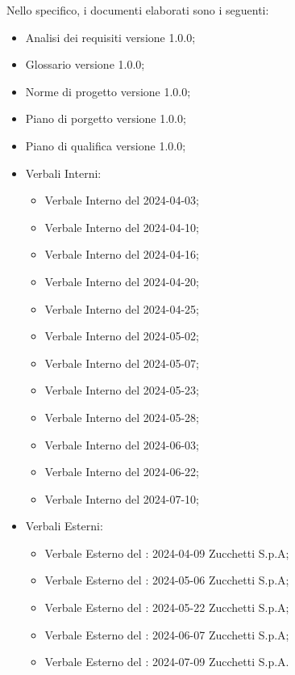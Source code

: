 Nello specifico, i documenti elaborati sono i seguenti: 
\begin{itemize}
    \item Analisi dei requisiti versione 1.0.0;
    \item Glossario versione 1.0.0;
    \item Norme di progetto versione 1.0.0;
    \item Piano di porgetto versione 1.0.0;
    \item Piano di qualifica versione 1.0.0; 
    \item Verbali Interni: 
        \begin{itemize}
            \item Verbale Interno del 2024-04-03;
            \item Verbale Interno del 2024-04-10;
            \item Verbale Interno del 2024-04-16;
            \item Verbale Interno del 2024-04-20;
            \item Verbale Interno del 2024-04-25;
            \item Verbale Interno del 2024-05-02;
            \item Verbale Interno del 2024-05-07;
            \item Verbale Interno del 2024-05-23;
            \item Verbale Interno del 2024-05-28;
            \item Verbale Interno del 2024-06-03;
            \item Verbale Interno del 2024-06-22;
            \item Verbale Interno del 2024-07-10;
        \end{itemize}
    \item Verbali Esterni:
    \begin{itemize}
        \item Verbale Esterno del : 2024-04-09 Zucchetti S.p.A;
        \item Verbale Esterno del : 2024-05-06 Zucchetti S.p.A;
        \item Verbale Esterno del : 2024-05-22 Zucchetti S.p.A;
        \item Verbale Esterno del : 2024-06-07 Zucchetti S.p.A;
        \item Verbale Esterno del : 2024-07-09 Zucchetti S.p.A.
    \end{itemize}
\end{itemize}

